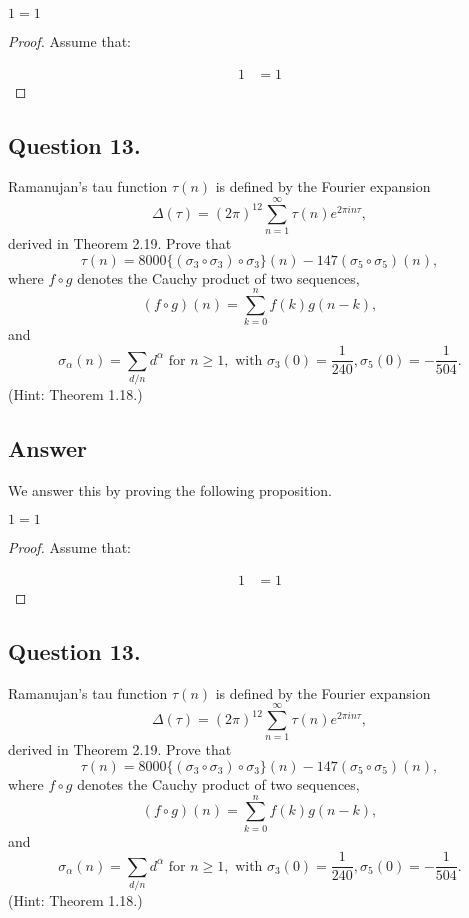 \begin{proposition}
    $1=1$
\end{proposition}

\begin{proof}
    Assume that:

    \begin{align*}
        1 &= 1
    \end{align*}

\end{proof}


\subsection{Question 13.}
\noindent
Ramanujan's tau function $\tau(n)$ is defined by the Fourier expansion
\[
    \Delta(\tau)=(2\pi)^{12}\sum_{n=1}^{\infty}\tau(n)e^{2\pi i n \tau},
\]
derived in Theorem 2.19. Prove that
\[
    \tau(n)=8000 \{ (\sigma_3 \circ \sigma_3) \circ \sigma_3 \}(n) - 147 (\sigma_5 \circ \sigma_5)(n),
\]
where $f \circ g$ denotes the Cauchy product of two sequences,
\[
    (f \circ g)(n) = \sum_{k=0}^{n}f(k)g(n-k),
\]
and
\[
    \sigma_{\alpha}(n)= \sum_{d/n} d^{\alpha} \text{ for } n\geq 1, \text{ with } \sigma_3(0)=\frac{1}{240},
    \sigma_5(0)=-\frac{1}{504}.
\]
(Hint: Theorem 1.18.)

\subsection*{Answer}
\noindent
We answer this by proving the following proposition.

\begin{proposition}
    $1=1$
\end{proposition}

\begin{proof}
    Assume that:

    \begin{align*}
        1 &= 1
    \end{align*}

\end{proof}


\subsection{Question 13.}
\noindent
Ramanujan's tau function $\tau(n)$ is defined by the Fourier expansion
\[
    \Delta(\tau)=(2\pi)^{12}\sum_{n=1}^{\infty}\tau(n)e^{2\pi i n \tau},
\]
derived in Theorem 2.19. Prove that
\[
    \tau(n)=8000 \{ (\sigma_3 \circ \sigma_3) \circ \sigma_3 \}(n) - 147 (\sigma_5 \circ \sigma_5)(n),
\]
where $f \circ g$ denotes the Cauchy product of two sequences,
\[
    (f \circ g)(n) = \sum_{k=0}^{n}f(k)g(n-k),
\]
and
\[
    \sigma_{\alpha}(n)= \sum_{d/n} d^{\alpha} \text{ for } n\geq 1, \text{ with } \sigma_3(0)=\frac{1}{240},
    \sigma_5(0)=-\frac{1}{504}.
\]
(Hint: Theorem 1.18.)

